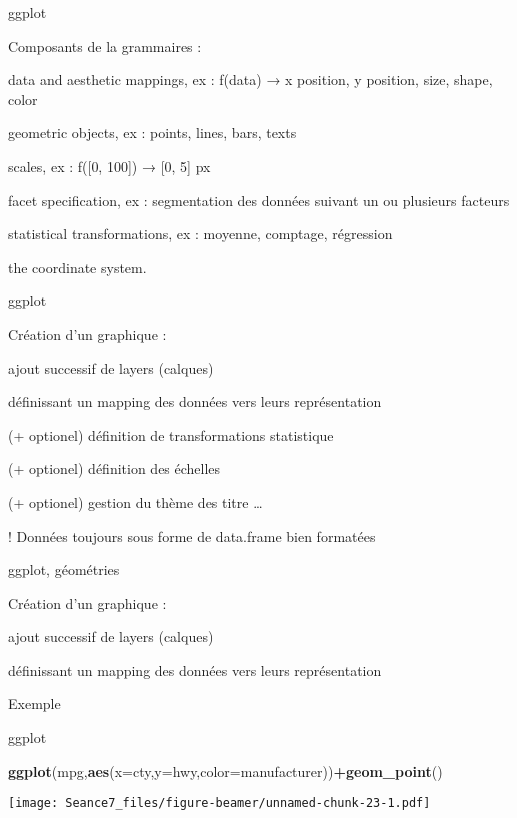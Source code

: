 \documentclass[ignorenonframetext,]{beamer}
\newenvironment{Shaded}{\begin{snugshade}}{\end{snugshade}}
\newcommand{\DataTypeTok}[1]{\textcolor[rgb]{0.13,0.29,0.53}{#1}}
\newcommand{\KeywordTok}[1]{\textcolor[rgb]{0.13,0.29,0.53}{\textbf{#1}}}
\newcommand{\NormalTok}[1]{#1}
\newcommand{\OperatorTok}[1]{\textcolor[rgb]{0.81,0.36,0.00}{\textbf{#1}}}
\begin{document}
\begin{frame}{ggplot}
\protect\hypertarget{ggplot-1}{}

Composants de la grammaires :

{data and aesthetic mappings}, ex : f(data) → x position, y position,
size, shape, color

{geometric objects}, ex : points, lines, bars, texts

{scales}, ex : f({[}0, 100{]}) → {[}0, 5{]} px

{facet specification}, ex : segmentation des données suivant un ou
plusieurs facteurs

{statistical transformations}, ex : moyenne, comptage, régression

{the coordinate system}.

\end{frame}

\begin{frame}{ggplot}
\protect\hypertarget{ggplot-2}{}

Création d'un graphique :

ajout successif de layers (calques)

définissant un mapping des données vers leurs représentation

(+ optionel) définition de transformations statistique

(+ optionel) définition des échelles

(+ optionel) gestion du thème des titre \ldots{}

! Données toujours sous forme de data.frame bien formatées

\end{frame}

\begin{frame}{{ggplot, géométries}}
\protect\hypertarget{ggplot-guxe9omuxe9tries}{}

Création d'un graphique :

ajout successif de layers (calques)

définissant un mapping des données vers leurs représentation

Exemple

\end{frame}

\begin{frame}[fragile]{ggplot}
\protect\hypertarget{ggplot-3}{}

\begin{Shaded}
\begin{Highlighting}[]
\KeywordTok{ggplot}\NormalTok{(mpg,}\KeywordTok{aes}\NormalTok{(}\DataTypeTok{x=}\NormalTok{cty,}\DataTypeTok{y=}\NormalTok{hwy,}\DataTypeTok{color=}\NormalTok{manufacturer))}\OperatorTok{+}\KeywordTok{geom_point}\NormalTok{()}
\end{Highlighting}
\end{Shaded}

\texttt{[image: Seance7\_files/figure-beamer/unnamed-chunk-23-1.pdf]}

\end{frame}
\end{document}
